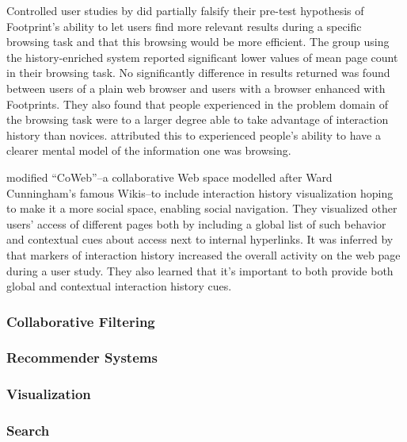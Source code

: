 Controlled user studies by \citeauthor{wexelblat99} did partially falsify
their pre-test hypothesis of Footprint's ability to let users find more
relevant results during a specific browsing task and that this browsing
would be more efficient. The group using the history-enriched system reported
significant lower values of mean page count in their browsing task. No
significantly difference in results returned was found between users of a
plain web browser and users with a browser enhanced with Footprints. They also
found that people experienced in the problem domain of the browsing task were
to a larger degree able to take advantage of interaction history than novices.
\citeauthor{wexelblat99} attributed this to experienced people's ability to
have a clearer mental model of the information one was browsing.

\citet{dieberger00a} modified ``CoWeb''--a collaborative Web space
modelled after Ward Cunningham's famous Wikis--to include interaction history
visualization hoping to make it a more social space, enabling social
navigation. They visualized other users' access of different pages both by
including a global list of such behavior and contextual cues about access
next to internal hyperlinks.
It was inferred by \citeauthor{dieberger00a} that markers of interaction
history increased the overall activity on the web page during a user study.
They also learned that it's important to both provide both global and
contextual interaction history cues.


\subsubsection{Collaborative Filtering}

\subsubsection{Recommender Systems}

\subsubsection{Visualization}

\subsubsection{Search}

